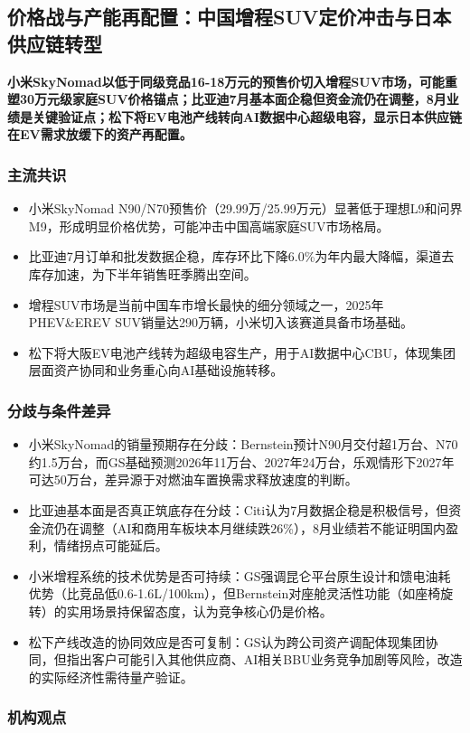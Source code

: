 \documentclass[11pt]{ctexart}
\begin{document}
\subsection{价格战与产能再配置：中国增程SUV定价冲击与日本供应链转型}
\textbf{小米SkyNomad以低于同级竞品16-18万元的预售价切入增程SUV市场，可能重塑30万元级家庭SUV价格锚点；比亚迪7月基本面企稳但资金流仍在调整，8月业绩是关键验证点；松下将EV电池产线转向AI数据中心超级电容，显示日本供应链在EV需求放缓下的资产再配置。}
\subsubsection*{主流共识}
\begin{itemize}
  \item 小米SkyNomad N90/N70预售价（29.99万/25.99万元）显著低于理想L9和问界M9，形成明显价格优势，可能冲击中国高端家庭SUV市场格局。
  \item 比亚迪7月订单和批发数据企稳，库存环比下降6.0\%为年内最大降幅，渠道去库存加速，为下半年销售旺季腾出空间。
  \item 增程SUV市场是当前中国车市增长最快的细分领域之一，2025年PHEV\&EREV SUV销量达290万辆，小米切入该赛道具备市场基础。
  \item 松下将大阪EV电池产线转为超级电容生产，用于AI数据中心CBU，体现集团层面资产协同和业务重心向AI基础设施转移。
\end{itemize}
\subsubsection*{分歧与条件差异}
\begin{itemize}
  \item 小米SkyNomad的销量预期存在分歧：Bernstein预计N90月交付超1万台、N70约1.5万台，而GS基础预测2026年11万台、2027年24万台，乐观情形下2027年可达50万台，差异源于对燃油车置换需求释放速度的判断。
  \item 比亚迪基本面是否真正筑底存在分歧：Citi认为7月数据企稳是积极信号，但资金流仍在调整（AI和商用车板块本月继续跌26\%），8月业绩若不能证明国内盈利，情绪拐点可能延后。
  \item 小米增程系统的技术优势是否可持续：GS强调昆仑平台原生设计和馈电油耗优势（比竞品低0.6-1.6L/100km），但Bernstein对座舱灵活性功能（如座椅旋转）的实用场景持保留态度，认为竞争核心仍是价格。
  \item 松下产线改造的协同效应是否可复制：GS认为跨公司资产调配体现集团协同，但指出客户可能引入其他供应商、AI相关BBU业务竞争加剧等风险，改造的实际经济性需待量产验证。
\end{itemize}
\subsubsection*{机构观点}
\end{document}

